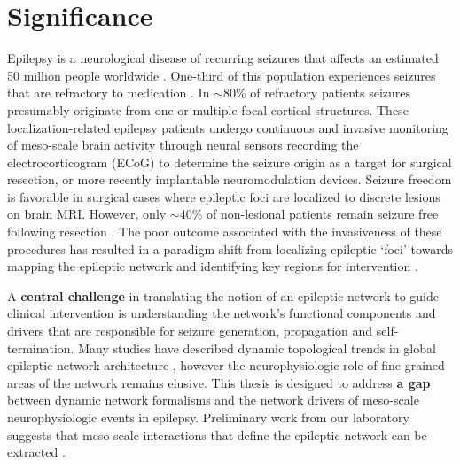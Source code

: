 \section{Significance}
Epilepsy is a neurological disease of recurring seizures that affects an estimated 50 million people worldwide \cite{kwan2000early}. One-third of this population experiences seizures that are refractory to medication \cite{kwan2000early}. In $\sim$80\% of refractory patients seizures presumably originate from one or multiple focal cortical structures. These localization-related epilepsy patients undergo continuous and invasive monitoring of meso-scale brain activity through neural sensors recording the electrocorticogram (ECoG) to determine the seizure origin as a target for surgical resection, or more recently implantable neuromodulation devices. Seizure freedom is favorable in surgical cases where epileptic foci are localized to discrete lesions on brain MRI. However, only $\sim$40\% of non-lesional patients remain seizure free following resection \cite{french2007refractory}. The poor outcome associated with the invasiveness of these procedures has resulted in a paradigm shift from localizing epileptic `foci' towards mapping the epileptic network and identifying key regions for intervention \cite{spencer2002neural, kramer2012epilepsy, lehnertz2014evolving}.

A \textbf{central challenge} in translating the notion of an epileptic network to guide clinical intervention is understanding the network's functional components and drivers that are responsible for seizure generation, propagation and self-termination. Many studies have described dynamic topological trends in global epileptic network architecture \cite{jerger2005multivariate, schindler2006assessing, schindler2008evolving, kramer2010coalescence, jiruska2012synchronization}, however the neurophysiologic role of fine-grained areas of the network remains elusive. This thesis is designed to address \textbf{a gap} between dynamic network formalisms and the network drivers of meso-scale neurophysiologic events in epilepsy. Preliminary work from our laboratory suggests that meso-scale interactions that define the epileptic network can be extracted \cite{khambhati2014dynamic}.

